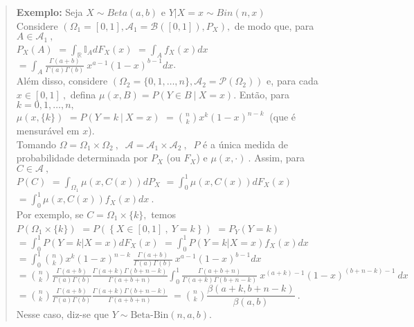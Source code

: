 \documentclass[
]{book}
\begin{document}
\begin{quote}
\textbf{Exemplo:} Seja \(X \sim Beta(a,b)\) e \(Y|X=x \sim Bin(n,x)\)\\
\(~\)\\
Considere \(\left(\Omega_1=[0,1],\mathcal{A}_1=\mathcal{B}([0,1]),P_X\right),\) de modo que, para \(A \in \mathcal{A}_1~,\)\\
\(P_X(A)\) \(=\displaystyle\int_{\mathbb{R}}\mathbb{I}_A dF_X(x)\) \(=\displaystyle\int_A f_X(x)dx\) \(=\displaystyle\int_A \tfrac{\Gamma(a+b)}{\Gamma(a)\Gamma(b)}~x^{a-1}(1-x)^{b-1}dx\).\\
Além disso, considere \(\left(\Omega_2=\{0,1,\ldots,n\}, \mathcal{A}_2=\mathcal{P}(\Omega_2)\right)\) e, para cada \(x \in [0,1]~,\) defina \(\mu(x,B)=P(Y \in B~|~ X=x).\) Então, para \(k=0,1,\ldots,n,\)\\
\(\mu\left(x,\{k\}\right)\) \(=P(Y=k~|~ X=x)\) \(=\displaystyle\binom{n}{k}x^k(1-x)^{n-k}~\) (que é mensurável em \(x\)).\\
Tomando \(\Omega=\Omega_1 \times \Omega_2~,~\) \(\mathcal{A}=\mathcal{A}_1 \times \mathcal{A}_2~,~\) \(P\) é a única medida de probabilidade determinada por \(P_X\) (ou \(F_X\)) e \(\mu(x,\cdot)~.\) Assim, para \(C \in \mathcal{A}~,\)\\
\(P(C)\) \(=\displaystyle\int_{\Omega_1}\mu\left(x,C(x)\right)dP_X\) \(=\displaystyle\int_0^1 \mu\left(x,C(x)\right)dF_X(x)\) \(=\displaystyle\int_0^1 \mu\left(x,C(x)\right)f_X(x)dx~.\)\\
\(~\)\\
Por exemplo, se \(C=\Omega_1 \times \{k\},\) temos\\
\(P\left(\Omega_1 \times \{k\}\right)\)
\(=P\left(\left\{X\in[0,1]~,~Y=k\right\}\right)\)
\(=P_Y\left(Y=k\right)\)
\(=\displaystyle\int_0^1P(Y=k|X=x)dF_X(x)\)
\(=\displaystyle\int_0^1P(Y=k|X=x)f_X(x)dx\)
\(=\displaystyle\int_0^1 \binom{n}{k}x^k(1-x)^{n-k} ~\tfrac{\Gamma(a+b)}{\Gamma(a)\Gamma(b)}~x^{a-1}(1-x)^{b-1}dx\)
\(=\displaystyle\binom{n}{k}\tfrac{\Gamma(a+b)}{\Gamma(a)\Gamma(b)}\tfrac{\Gamma(a+k)\Gamma(b+n-k)}{\Gamma(a+b+n)}\int_0^1\tfrac{\Gamma(a+b+n)}{\Gamma(a+k)\Gamma(b+n-k)}~x^{(a+k)-1}(1-x)^{(b+n-k)-1}~dx\)
\(=\displaystyle\binom{n}{k}\tfrac{\Gamma(a+b)}{\Gamma(a)\Gamma(b)}\tfrac{\Gamma(a+k)\Gamma(b+n-k)}{\Gamma(a+b+n)}\)
\(=\displaystyle\binom{n}{k}\dfrac{\beta(a+k,b+n-k)}{\beta(a,b)}~.\)\\
\(~\)\\
Nesse caso, diz-se que \(Y \sim \text{Beta-Bin}(n,a,b)\).
\end{quote}
\end{document}

